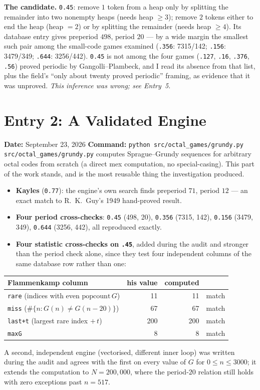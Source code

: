 \documentclass[12pt]{article}
\begin{document}
\textbf{The candidate.} \texttt{0.45}: remove $1$ token from a heap only by
splitting the remainder into two nonempty heaps (needs heap $\ge3$); remove
$2$ tokens either to end the heap (heap $=2$) or by splitting the remainder
(needs heap $\ge4$). Its database entry gives preperiod $498$, period $20$ ---
by a wide margin the smallest such pair among the small-code games examined
(\texttt{.356}: 7315/142; \texttt{.156}: 3479/349; \texttt{.644}: 3256/442).
\texttt{0.45} is not among the four games (\texttt{.127}, \texttt{.16},
\texttt{.376}, \texttt{.56}) proved periodic by Gangolli--Plambeck, and I read
its absence from that list, plus the field's ``only about twenty proved
periodic'' framing, as evidence that it was unproved. \emph{This inference was
wrong; see Entry~5.}

\section*{Entry 2: A Validated Engine}
\textbf{Date:} September 23, 2026 \quad
\textbf{Command:} \texttt{python src/octal\_games/grundy.py} \\
\texttt{src/octal\_games/grundy.py} computes Sprague--Grundy sequences for
arbitrary octal codes from scratch (a direct mex computation, no
special-casing). This part of the work stands, and is the most reusable thing
the investigation produced.
\begin{itemize}
\item \textbf{Kayles} (\texttt{0.77}): the engine's own search finds preperiod
$71$, period $12$ --- an exact match to R.~K.~Guy's 1949 hand-proved result.
\item \textbf{Four period cross-checks}: \texttt{0.45} (498, 20),
\texttt{0.356} (7315, 142), \texttt{0.156} (3479, 349), \texttt{0.644}
(3256, 442), all reproduced exactly.
\item \textbf{Four statistic cross-checks on \texttt{.45}}, added during the
audit and stronger than the period check alone, since they test four
independent columns of the same database row rather than one:
\end{itemize}
\begin{center}
\begin{tabular}{lrrl}
\toprule
Flammenkamp column & his value & computed & \\
\midrule
\texttt{rare} (indices with even $\mathrm{popcount}\,G$) & 11 & 11 & match \\
\texttt{miss} ($\#\{n: G(n)\ne G(n-20)\}$)              & 67 & 67 & match \\
\texttt{last+t} (largest rare index $+\,t$)             & 200 & 200 & match \\
\texttt{maxG}                                            & 8  & 8  & match \\
\bottomrule
\end{tabular}
\end{center}
A second, independent engine (vectorised, different inner loop) was written
during the audit and agrees with the first on every value of $G$ for
$0\le n\le3000$; it extends the computation to $N=200{,}000$, where the
period-$20$ relation still holds with zero exceptions past $n=517$.
\end{document}

